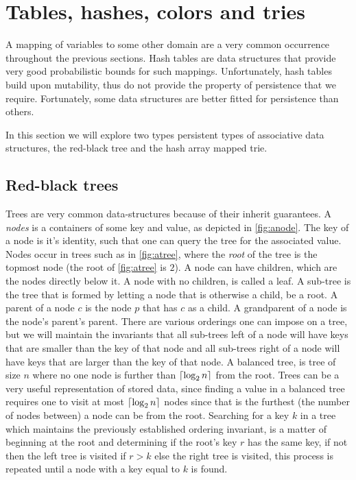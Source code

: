\section{Tables, hashes, colors and tries}
A mapping of variables to some other domain are a very common occurrence throughout the previous sections.
Hash tables are data structures that provide very good probabilistic bounds for such mappings.
Unfortunately, hash tables build upon mutability, thus do not provide the property of persistence that we require.
Fortunately, some data structures are better fitted for persistence than others.

In this section we will explore two types persistent types of associative data structures, the red-black tree and the hash array mapped trie.

\subsection{Red-black trees}\label{sub:rb}
Trees are very common data-structures because of their inherit guarantees.
A \textit{nodes} is a containers of some key and value, as depicted in \autoref{fig:anode}.
The key of a node is it's identity, such that one can query the tree for the associated value.
Nodes occur in trees such as in \autoref{fig:atree}, where the \textit{root} of the tree is the topmost node (the root of \autoref{fig:atree} is $2$).
A node can have children, which are the nodes directly below it.
A node with no children, is called a leaf.
A sub-tree is the tree that is formed by letting a node that is otherwise a child, be a root.
A parent of a node $c$ is the node $p$ that has $c$ as a child.
A grandparent of a node is the node's parent's parent.
There are various orderings one can impose on a tree, but we will maintain the invariants that all sub-trees left of a node will have keys that are smaller than the key of that node and all sub-trees right of a node will have keys that are larger than the key of that node.
A balanced tree, is tree of size $n$ where no one node is further than $\lceil\log_2 n\rceil$ from the root.
Trees can be a very useful representation of stored data, since finding a value in a balanced tree requires one to visit at most $\lceil\log_2 n\rceil$ nodes since that is the furthest (the number of nodes between) a node can be from the root.
Searching for a key $k$ in a tree which maintains the previously established ordering invariant, is a matter of beginning at the root and determining if the root's key $r$ has the same key, if not then the left tree is visited if $r > k$ else the right tree is visited, this process is repeated until a node with a key equal to $k$ is found.
